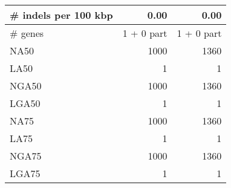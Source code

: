 \begin{table}[ht]
\begin{center}
\begin{tabular}{|l*{2}{|r}|}
\# indels per 100 kbp & 0.00 & 0.00 \\ \hline
\# genes & 1 + 0 part & 1 + 0 part \\ \hline
NA50 & 1000 & 1360 \\ \hline
LA50 & 1 & 1 \\ \hline
NGA50 & 1000 & 1360 \\ \hline
LGA50 & 1 & 1 \\ \hline
NA75 & 1000 & 1360 \\ \hline
LA75 & 1 & 1 \\ \hline
NGA75 & 1000 & 1360 \\ \hline
LGA75 & 1 & 1 \\ \hline
\end{tabular}
\end{center}
\end{table}
